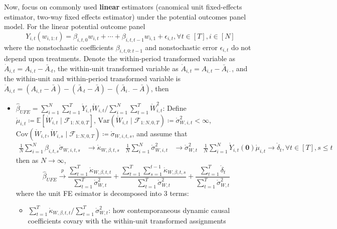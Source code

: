 \documentclass[twoside]{article}
\begin{document}
Now, focus on commonly used \textbf{linear} estimators (canomical unit fixed-effects estimator, two-way fixed effects estimator) under the potential outcomes panel model.
For the linear potential outcome panel
$$ Y_{i,t}\left(w_{i,1:t}\right) = \beta_{i,t,0}w_{i,t} + \cdots + \beta_{i,t,t-1}w_{i,1} + \epsilon_{i,t},\forall t\in [T],i\in[N] $$
where the nonstochastic coefficients $\beta_{i,t,0:t-1}$ and nonstochastic error $\epsilon_{i,t}$ do not depend upon treatments.
Denote the within-period transformed variable as $\dot{A}_{i,t}=A_{i,t}-\bar{A}_{\cdot t}$, the within-unit transformed variable as $\mathring{A}_{i,t}= A_{i,t}-\bar{A}_{i\cdot}$, and the within-unit and within-period transformed variable is $\ddot{A}_{i,t}=(A_{i,t}-\bar{A})-(\bar{A}_{\cdot t}-\bar{A}) - (\bar{A}_{i\cdot}-\bar{A})$, then 
\begin{itemize}
    \item {} $\hat{\beta}_{UFE} = \sum^N_{i=1}\sum^T_{t=1} \mathring{Y}_{i,t}\mathring{W}_{i,t}/\sum^N_{i=1}\sum^T_{t=1}\mathring{W}^2_{i,t} $: Define $\mathring{\mu}_{i,t}\coloneq \mathbb{E}[\mathring{W}_{i,t}\mid\mathcal{F}_{1:N,0,T}]$, $\mathrm{Var}(\mathring{W}_{i,t}\mid \mathcal{F}_{1:N,0,T})\coloneq \mathring{\sigma}^2_{W,i,t}<\infty$, $\mathrm{Cov}(\mathring{W}_{i,t},\mathring{W}_{i,s}\mid\mathcal{F}_{1:N,0,T}) \coloneq \mathring{\sigma}_{W,i,t,s}$, and assume that 
    \begin{align*}
        \frac{1}{N}\sum^N_{i=1}\beta_{i,t,s}\mathring{\sigma}_{W,i,t,s} &\rightarrow \mathring{\kappa}_{W,\beta,t,s} & \frac{1}{N}\sum^N_{i=1}\mathring{\sigma}^2_{W,i,t} &\rightarrow\mathring{\sigma}^2_{W,t} & \frac{1}{N}\sum^N_{i=1}\mathring{Y}_{i,t}(\mathbf{0})\mathring{\mu}_{i,t}\rightarrow \mathring{\delta}_t, \forall t\in [T], s\leq t
    \end{align*}
    then as $N\rightarrow\infty$,
    \begin{equation*}
        \hat{\beta}_{UFE}\xrightarrow{p} \frac{\sum^T_{t=1}\mathring{\kappa}_{W,\beta,t,t}}{\sum^T_{t=1}\mathring{\sigma}^2_{W,t}} + \frac{\sum^T_{t=1}\sum^{t-1}_{s=1}\mathring{\kappa}_{W,\beta,t,s}}{\sum^T_{t=1}\mathring{\sigma}^2_{W,t}} + \frac{\sum^T_{t=1}\mathring{\delta}_t}{\sum^T_{t=1}\mathring{\sigma}^2_{W,t}}
    \end{equation*}
    where the unit FE esimator is decomposed into 3 terms:
    \begin{itemize}
        \item ${\sum^T_{t=1}\mathring{\kappa}_{W,\beta,t,t}}/{\sum^T_{t=1}\mathring{\sigma}^2_{W,t}}$: how contemporaneous dynamic causal coefficients covary with the within-unit transformed assignments

\end{itemize}
\end{itemize}
\end{document}

